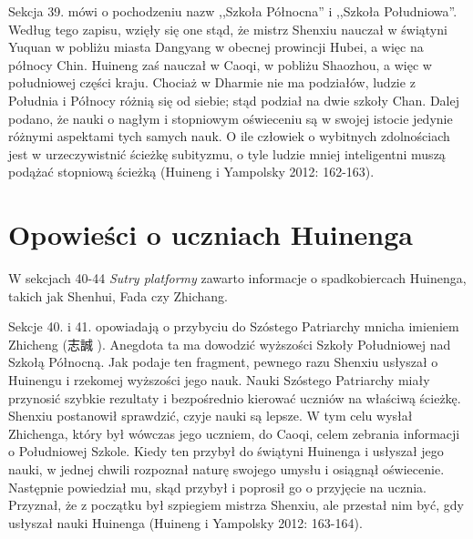 Sekcja 39. mówi o pochodzeniu nazw ,,Szkoła Północna'' i ,,Szkoła Południowa''.
Według tego zapisu, wzięły się one stąd, że mistrz Shenxiu nauczał w świątyni Yuquan w pobliżu miasta Dangyang w obecnej prowincji Hubei, a więc na północy Chin.
Huineng zaś nauczał w Caoqi, w pobliżu Shaozhou, a więc w południowej części kraju.
Chociaż w Dharmie nie ma podziałów, ludzie z Południa i Północy różnią się od siebie; stąd podział na dwie szkoły Chan.
Dalej podano, że nauki o nagłym i stopniowym oświeceniu są w swojej istocie jedynie różnymi aspektami tych samych nauk.
O ile człowiek o wybitnych zdolnościach jest w urzeczywistnić ścieżkę subityzmu, o tyle ludzie mniej inteligentni muszą podążać stopniową ścieżką
(Huineng i Yampolsky 2012: 162-163).

\section{Opowieści o uczniach Huinenga}
W sekcjach 40-44 \textit{Sutry platformy} zawarto informacje o spadkobiercach Huinenga, takich jak Shenhui, Fada czy Zhichang.

Sekcje 40. i 41. opowiadają o przybyciu do Szóstego Patriarchy mnicha imieniem Zhicheng (志誠 ).
Anegdota ta ma dowodzić wyższości Szkoły Południowej nad Szkołą Północną.
Jak podaje ten fragment, pewnego razu Shenxiu usłyszał o Huinengu i rzekomej wyższości jego nauk.
Nauki Szóstego Patriarchy miały przynosić szybkie rezultaty i bezpośrednio kierować uczniów na właściwą ścieżkę. %
Shenxiu postanowił sprawdzić, czyje nauki są lepsze.
W tym celu wysłał Zhichenga, który był wówczas jego uczniem, do Caoqi, celem zebrania informacji o Południowej Szkole.
Kiedy ten przybył do świątyni Huinenga i usłyszał jego nauki, w jednej chwili rozpoznał naturę swojego umysłu i osiągnął oświecenie.
Następnie powiedział mu, skąd przybył i poprosił go o przyjęcie na ucznia.
Przyznał, że z początku był szpiegiem mistrza Shenxiu, ale przestał nim być, gdy usłyszał nauki Huinenga
(Huineng i Yampolsky 2012: 163-164).

